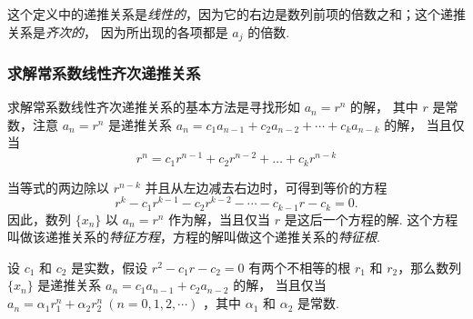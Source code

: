 这个定义中的递推关系是\textit{线性的}，因为它的右边是数列前项的倍数之和；这个递推关系是\textit{齐次的}，
因为所出现的各项都是 $a_j$ 的倍数.

\subsubsection{求解常系数线性齐次递推关系}

求解常系数线性齐次递推关系的基本方法是寻找形如 $a_n=r^n$ 的解，
其中 $r$ 是常数，注意 $a_n=r^n$ 是递推关系 $a_n=c_{1}a_{n-1}+c_{2}a_{n-2}+\cdots +c_{k}a_{n-k}$ 的解，
当且仅当 $$r^{n}=c_{1}r^{n-1}+c_{2}r^{n-2}+\ldots +c_{k}r^{n-k}$$

当等式的两边除以 $r^{n-k}$ 并且从左边减去右边时，可得到等价的方程
$$r^{k}-c_{1}r^{k-1}-c_{2}r^{k-2}-\cdots -c_{k-1}r-c_{k}=0.$$
因此，数列 $\{x_n\}$ 以 $a_n=r^n$ 作为解，当且仅当 $r$ 是这后一个方程的解.
这个方程叫做该递推关系的\textit{特征方程}，方程的解叫做这个递推关系的\textit{特征根}.

\begin{theorem}[常系数线性齐次递推定理]
    设 $c_1$ 和 $c_2$ 是实数，假设 $r^2-c_1r-c_2=0$ 有两个不相等的根 $r_1$ 和 $r_2$，那么数列 $\{x_n\}$ 是递推关系 $a_n=c_1a_{n-1}+c_2a_{n-2}$ 的解，
    当且仅当 $a_n=\alpha_1 r_1^n+\alpha_2 r_2^n~  (n=0,1,2,\cdots)$ ，其中 $\alpha_1$ 和 $\alpha_2$ 是常数.
\end{theorem}

